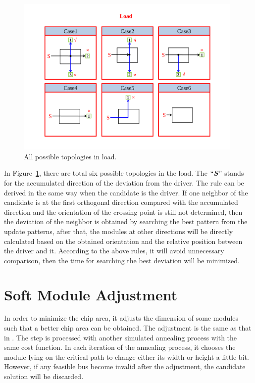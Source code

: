 \begin{figure}[htb]
  \centering
    \includegraphics[width=11cm]{Fig/deviation_load.pdf}
     \caption{
      All possible topologies in load.
   }
  \label{fig::deviation_load}
\end{figure}

In Figure~\ref{fig::deviation_load}, there are total six possible topologies
in the load. The $``$\textbf{\textit{S}}$"$ stands for the accumulated direction of the deviation
from the driver.
The rule can be derived in the same way when the candidate is the driver.
If one neighbor of the candidate is at the first orthogonal direction compared with the accumulated direction
and the orientation of the crossing point is still not determined,
then the deviation of the neighbor is obtained by searching the best pattern from the update patterns,
after that, the modules at other directions will be directly calculated based on the obtained orientation and the
relative position between the driver and it.
According to the above rules, it will avoid unnecessary comparison, then the time for searching the best deviation will be minimized.

\section{Soft Module Adjustment} \label{sec::SOFT MODULE ADJUSTMENT}
In order to minimize the chip area, it adjusts the
dimension of some modules such that a better chip area can be
obtained. The adjustment is the same as that in \cite{Xiang03}.
The step is processed with another simulated annealing
process with the same cost function. In
each iteration of the annealing process, it chooses the module
lying on the critical path to change either its width or height a
little bit. However, if any feasible bus become invalid after
the adjustment, the candidate solution will be discarded.

